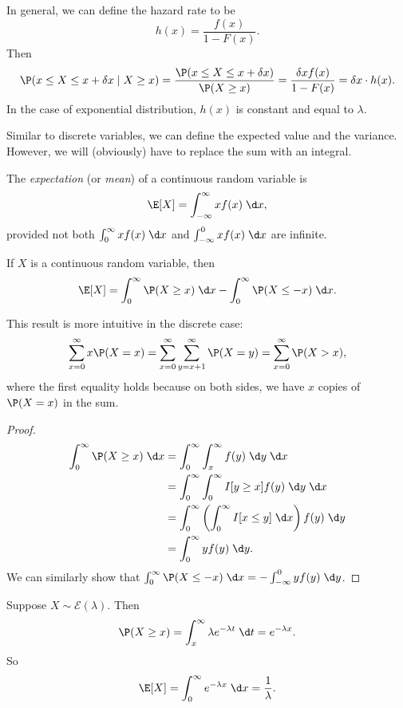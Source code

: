 \documentclass[a4paper]{article}
\begin{document}
In general, we can define the hazard rate to be
\[
  h(x) = \frac{f(x)}{1 - F(x)}.
\]
Then
\[
  \P(x \leq X \leq x + \delta x \mid X \geq x) = \frac{\P(x \leq X \leq x + \delta x)}{\P(X \geq x)} = \frac{\delta x f(x)}{1 - F(x)} = \delta x\cdot h(x).
\]
In the case of exponential distribution, $h(x)$ is constant and equal to $\lambda$.

Similar to discrete variables, we can define the expected value and the variance. However, we will (obviously) have to replace the sum with an integral.
\begin{defi}[Expectation]
  The \emph{expectation} (or \emph{mean}) of a continuous random variable is
  \[
    \E[X] = \int_{-\infty}^\infty xf(x) \;\d x,
  \]
  provided not both $\int_0^\infty xf(x)\;\d x$ and $\int_{-\infty}^0 xf(x) \;\d x$ are infinite.
\end{defi}

\begin{thm}
  If $X$ is a continuous random variable, then
  \[
    \E[X] = \int_0^\infty \P(X \geq x)\;\d x - \int_0^\infty \P(X \leq -x)\;\d x.
  \]
\end{thm}
This result is more intuitive in the discrete case:
\[
  \sum_{x = 0}^\infty x \P(X = x) = \sum_{x = 0}^\infty \sum_{y = x + 1}^\infty \P(X = y) = \sum_{x = 0}^\infty \P(X > x),
\]
where the first equality holds because on both sides, we have $x$ copies of $\P(X = x)$ in the sum.

\begin{proof}
  \begin{align*}
    \int_0^\infty \P(X \geq x)\;\d x &= \int_0^\infty \int_x^\infty f(y)\;\d y\;\d x\\
    &= \int_0^\infty \int_0^\infty I[y\geq x]f(y)\;\d y\;\d x\\
    &= \int_0^\infty \left(\int_0^\infty I[x\leq y]\;\d x\right) f(y)\;\d y\\
    &= \int_0^\infty yf(y)\;\d y.
  \end{align*}
  We can similarly show that $\int_0^\infty \P(X \leq -x)\;\d x = -\int_{-\infty}^0 yf(y)\;\d y$.
\end{proof}

\begin{eg}
  Suppose $X\sim \mathcal{E}(\lambda)$. Then
  \[
    \P(X \geq x) = \int_x^{\infty} \lambda e^{-\lambda t}\;\d t = e^{-\lambda x}.
  \]
  So
  \[
    \E[X] = \int_0^\infty e^{-\lambda x}\;\d x = \frac{1}{\lambda}.\qedhere
  \]
\end{eg}
\end{document}
